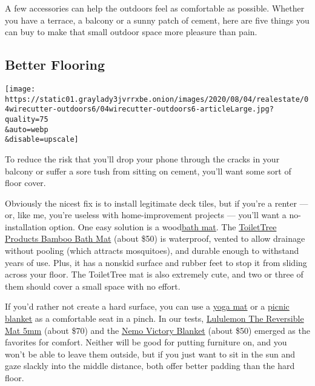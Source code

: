 A few accessories can help the outdoors feel as comfortable as possible.
Whether you have a terrace, a balcony or a sunny patch of cement, here
are five things you can buy to make that small outdoor space more
pleasure than pain.

\hypertarget{better-flooring}{%
\subsection{Better Flooring}\label{better-flooring}}

\texttt{[image: https://static01.graylady3jvrrxbe.onion/images/2020/08/04/realestate/04wirecutter-outdoors6/04wirecutter-outdoors6-articleLarge.jpg?quality=75\\\&auto=webp\\\&disable=upscale]}

To reduce the risk that you'll drop your phone through the cracks in
your balcony or suffer a sore tush from sitting on cement, you'll want
some sort of floor cover.

Obviously the nicest fix is to install legitimate deck tiles, but if
you're a renter --- or, like me, you're useless with home-improvement
projects --- you'll want a no-installation option. One easy solution is
a
wood\href{https://www.nytimes3xbfgragh.onion/wirecutter/reviews/best-bathroom-rugs-and-bath-mats/?utm_source=nytimes\&utm_medium=referral\&utm_campaign=outdoor-space}{bath
mat}. The
\href{https://www.nytimes3xbfgragh.onion/wirecutter/reviews/best-bathroom-rugs-and-bath-mats/?utm_source=nytimes\&utm_medium=referral\&utm_campaign=outdoor-space\#a-spa-style-wood-platform-toilettree-products-bamboo-bath-mat}{ToiletTree
Products Bamboo Bath Mat} (about \$50) is waterproof, vented to allow
drainage without pooling (which attracts mosquitoes), and durable enough
to withstand years of use. Plus, it has a nonskid surface and rubber
feet to stop it from sliding across your floor. The ToiletTree mat is
also extremely cute, and two or three of them should cover a small space
with no effort.

If you'd rather not create a hard surface, you can use a
\href{https://www.nytimes3xbfgragh.onion/wirecutter/reviews/best-yoga-mats/?utm_source=nytimes\&utm_medium=referral\&utm_campaign=outdoor-space}{yoga
mat} or a
\href{https://www.nytimes3xbfgragh.onion/wirecutter/reviews/best-picnic-blanket/?utm_source=nytimes\&utm_medium=referral\&utm_campaign=outdoor-space}{picnic
blanket} as a comfortable seat in a pinch. In our tests,
\href{https://www.nytimes3xbfgragh.onion/wirecutter/reviews/best-yoga-mats/?utm_source=nytimes\&utm_medium=referral\&utm_campaign=outdoor-space\#our-pick-lululemon-the-reversible-mat-5mm}{Lululemon
The Reversible Mat 5mm} (about \$70) and the
\href{https://www.nytimes3xbfgragh.onion/wirecutter/reviews/best-picnic-blanket/?utm_source=nytimes\&utm_medium=referral\&utm_campaign=outdoor-space\#best-overall-picnic-blanket-nemo-victory-blanket}{Nemo
Victory Blanket} (about \$50) emerged as the favorites for comfort.
Neither will be good for putting furniture on, and you won't be able to
leave them outside, but if you just want to sit in the sun and gaze
slackly into the middle distance, both offer better padding than the
hard floor.

